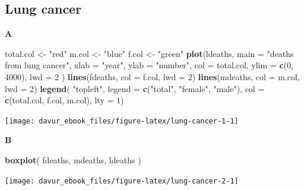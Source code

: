 \documentclass[]{book}
\newenvironment{Shaded}{\begin{snugshade}}{\end{snugshade}}
\newcommand{\DataTypeTok}[1]{\textcolor[rgb]{0.13,0.29,0.53}{#1}}
\newcommand{\DecValTok}[1]{\textcolor[rgb]{0.00,0.00,0.81}{#1}}
\newcommand{\KeywordTok}[1]{\textcolor[rgb]{0.13,0.29,0.53}{\textbf{#1}}}
\newcommand{\NormalTok}[1]{#1}
\newcommand{\StringTok}[1]{\textcolor[rgb]{0.31,0.60,0.02}{#1}}
\begin{document}
\hypertarget{lung-cancer-1}{%
\subsection{Lung cancer}\label{lung-cancer-1}}

\textbf{A}

\begin{Shaded}
\begin{Highlighting}[]
\NormalTok{total.col <-}\StringTok{ "red"}
\NormalTok{m.col <-}\StringTok{ "blue"}
\NormalTok{f.col <-}\StringTok{ "green"}
\KeywordTok{plot}\NormalTok{(ldeaths,}
         \DataTypeTok{main =} \StringTok{"deaths from lung cancer"}\NormalTok{,}
         \DataTypeTok{xlab =} \StringTok{"year"}\NormalTok{,}
         \DataTypeTok{ylab =} \StringTok{"number"}\NormalTok{,}
         \DataTypeTok{col =}\NormalTok{ total.col,}
         \DataTypeTok{ylim =} \KeywordTok{c}\NormalTok{(}\DecValTok{0}\NormalTok{, }\DecValTok{4000}\NormalTok{),}
         \DataTypeTok{lwd =} \DecValTok{2}
\NormalTok{)}
\KeywordTok{lines}\NormalTok{(fdeaths, }\DataTypeTok{col =}\NormalTok{ f.col, }\DataTypeTok{lwd =} \DecValTok{2}\NormalTok{)}
\KeywordTok{lines}\NormalTok{(mdeaths, }\DataTypeTok{col =}\NormalTok{ m.col, }\DataTypeTok{lwd =} \DecValTok{2}\NormalTok{)}
\KeywordTok{legend}\NormalTok{(}
    \StringTok{"topleft"}\NormalTok{, }
    \DataTypeTok{legend =} \KeywordTok{c}\NormalTok{(}\StringTok{"total"}\NormalTok{, }\StringTok{"female"}\NormalTok{, }\StringTok{"male"}\NormalTok{), }
    \DataTypeTok{col =} \KeywordTok{c}\NormalTok{(total.col, f.col, m.col), }
    \DataTypeTok{lty =} \DecValTok{1}\NormalTok{)}
\end{Highlighting}
\end{Shaded}

\begin{center}\texttt{[image: davur\_ebook\_files/figure-latex/lung-cancer-1-1]} \end{center}

\textbf{B}

\begin{Shaded}
\begin{Highlighting}[]
\KeywordTok{boxplot}\NormalTok{(}
\NormalTok{    fdeaths, mdeaths, ldeaths}
\NormalTok{)}
\end{Highlighting}
\end{Shaded}

\begin{center}\texttt{[image: davur\_ebook\_files/figure-latex/lung-cancer-2-1]} \end{center}
\end{document}
